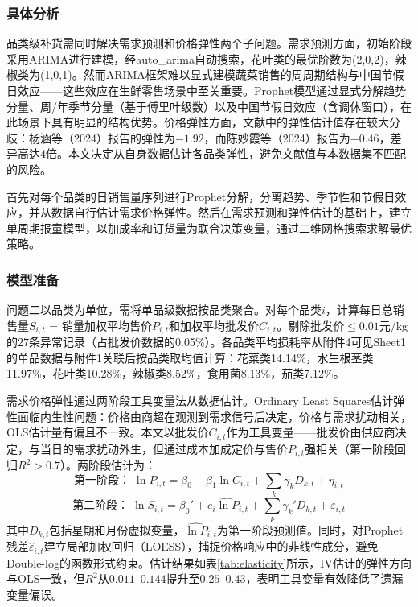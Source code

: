 
\subsubsection{具体分析}

品类级补货需同时解决需求预测和价格弹性两个子问题。需求预测方面，初始阶段采用ARIMA进行建模\cite{Wang2022}，经auto\_arima自动搜索，花叶类的最优阶数为(2,0,2)，辣椒类为(1,0,1)。然而ARIMA框架难以显式建模蔬菜销售的周周期结构与中国节假日效应——这些效应在生鲜零售场景中至关重要。Prophet模型通过显式分解趋势分量、周/年季节分量（基于傅里叶级数）以及中国节假日效应（含调休窗口），在此场景下具有明显的结构优势。价格弹性方面，文献中的弹性估计值存在较大分歧：杨涵等（2024）报告的弹性为$-1.92$，而陈妙霞等（2024）报告为$-0.46$\cite{Yang2024,Chen2024}，差异高达4倍。本文决定从自身数据估计各品类弹性，避免文献值与本数据集不匹配的风险。

首先对每个品类的日销售量序列进行Prophet分解，分离趋势、季节性和节假日效应，并从数据自行估计需求价格弹性。然后在需求预测和弹性估计的基础上，建立单周期报童模型，以加成率和订货量为联合决策变量，通过二维网格搜索求解最优策略。

\subsubsection{模型准备}

问题二以品类为单位，需将单品级数据按品类聚合。对每个品类$i$，计算每日总销售量$S_{i,t}$ = 销量加权平均售价$P_{i,t}$和加权平均批发价$C_{i,t}$。剔除批发价$\leq 0.01$元/kg的27条异常记录（占批发价数据的0.05\%）。各品类平均损耗率从附件4可见Sheet1的单品数据与附件1关联后按品类取均值计算：花菜类14.14\%，水生根茎类11.97\%，花叶类10.28\%，辣椒类8.52\%，食用菌8.13\%，茄类7.12\%。

需求价格弹性通过两阶段工具变量法从数据估计。Ordinary Least Squares估计弹性面临内生性问题：价格由商超在观测到需求信号后决定，价格与需求扰动相关，OLS估计量有偏且不一致。本文以批发价$C_{i,t}$作为工具变量——批发价由供应商决定，与当日的需求扰动外生，但通过成本加成定价与售价$P_{i,t}$强相关（第一阶段回归$R^2 > 0.7$）。两阶段估计为：
\begin{equation}
  \text{第一阶段：}\;\ln P_{i,t} = \beta_0 + \beta_1 \ln C_{i,t} + \sum_{k}\gamma_k D_{k,t} + \eta_{i,t}
\end{equation}
\begin{equation}
  \text{第二阶段：}\;\ln S_{i,t} = \beta_0' + e_i \widehat{\ln P}_{i,t} + \sum_{k}\gamma_k' D_{k,t} + \varepsilon_{i,t}
\end{equation}
其中$D_{k,t}$包括星期和月份虚拟变量，$\widehat{\ln P}_{i,t}$为第一阶段预测值。同时，对Prophet残差$\hat{\varepsilon}_{i,t}$建立局部加权回归（LOESS），捕捉价格响应中的非线性成分，避免Double-log的函数形式约束。估计结果如表\ref{tab:elasticity}所示，IV估计的弹性方向与OLS一致，但$R^2$从$0.011$--$0.144$提升至$0.25$--$0.43$，表明工具变量有效降低了遗漏变量偏误。

